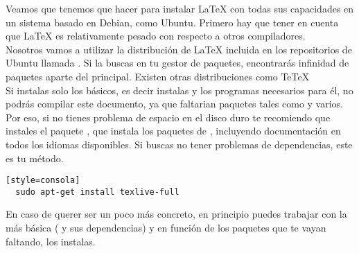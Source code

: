 

Veamos que tenemos que hacer para instalar \LaTeX{} con todas sus
capacidades en un sistema basado en Debian, como Ubuntu.
Primero hay que tener en cuenta que \LaTeX{} es relativamente pesado
con respecto a otros compiladores. \\

Nosotros vamos a utilizar la distribución de \LaTeX{} incluida en los
repositorios de Ubuntu llamada . Si la buscas en
tu gestor de paquetes, encontrarás infinidad de paquetes aparte
del principal. Existen otras distribuciones como Te\TeX\\

Si instalas solo los básicos, es decir instalas  y
los programas necesarios para él, no podrás compilar este documento,
ya que faltarian paquetes tales como  y
varios. Por eso, si no tienes problema de espacio en el disco duro te
recomiendo que instales el paquete , que
instala  los paquetes de , incluyendo
documentación en todos los idiomas disponibles. Si buscas no tener
problemas de dependencias, este es tu método.\\

\begin{verbatim}[style=consola]
  sudo apt-get install texlive-full
\end{verbatim}

En caso de querer ser un poco más concreto, en principio puedes
trabajar con la más básica ( y sus dependencias) y
en función de los paquetes que te vayan faltando, los instalas.

